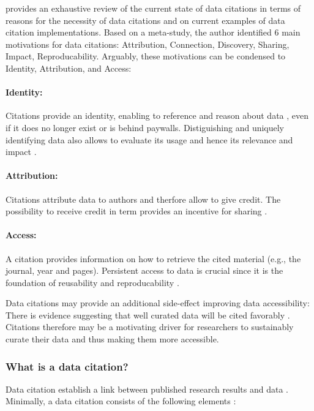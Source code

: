 \documentclass[letterpaper, parskip=half]{scrartcl}
\begin{document}
\cite{Silvello2017} provides an exhaustive review of the current state of data citations in terms of reasons for the necessity of data citations and on current examples of data citation implementations. Based on a meta-study, the author identified 6 main motivations for data citations: Attribution, Connection, Discovery, Sharing, Impact, Reproducability. 
Arguably, these motivations can be condensed to Identity, Attribution, and Access: 

\paragraph{Identity:} 
Citations provide an identity, enabling to reference and reason about data \citep{Bandrowski2016}, even if it does no longer exist or is behind paywalls. 
Distiguishing and uniquely identifying data also allows to evaluate its usage and hence its relevance and impact \citep{Honor2016}.

\paragraph{Attribution:}
Citations attribute data to authors and therfore allow to give credit.
The possibility to receive credit in term provides an incentive for sharing \citep{Niemeyer2016, Callaghan2012, Kratz2014}. 



\paragraph{Access:} 
A citation provides information on how to retrieve the cited material (e.g., the journal, year and pages). Persistent access to data is crucial since it is the foundation of reusability and reproducability \citep{Starr2015}. 

Data citations may provide an additional side-effect improving data accessibility: There is evidence suggesting that well curated data will be cited favorably \citep{Belter2014}. Citations therefore may be a motivating driver for researchers to sustainably curate their data and thus making them more accessible.


\subsubsection{What is a data citation?}
Data citation establish a link between published research results and data \citep{CODATA2013}. Minimally, a data citation consists of the following elements \citep{Cook2016}:
\end{document}
